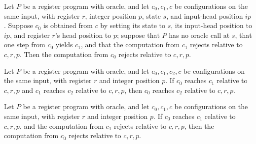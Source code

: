 \begin{lemma}
\label{Complexity.LogProg.Rejects.step}
\leanok
{}
Let $P$ be a register program with oracle, and let $c_0,c_1,c$ be configurations on the
same input, with register $r$, integer position $p$, state $s$, and input-head position
$ip$. Suppose $c_0$ is obtained from $c$ by setting its state to $s$, its input-head
position to $ip$, and register $r$'s head position to $p$; suppose that $P$ has no
oracle call at $s$, that one step from $c_0$ yields $c_1$, and that the computation from
$c_1$ rejects relative to $c,r,p$. Then the computation from $c_0$ rejects relative to
$c,r,p$.
\end{lemma}

\begin{lemma}
\label{Complexity.LogProg.Reaches.trans}
\leanok
{}
Let $P$ be a register program with oracle, and let $c_0,c_1,c_2,c$ be configurations on
the same input, with register $r$ and integer position $p$. If $c_0$ reaches $c_1$
relative to $c,r,p$ and $c_1$ reaches $c_2$ relative to $c,r,p$, then $c_0$ reaches
$c_2$ relative to $c,r,p$.
\end{lemma}

\begin{lemma}
\label{Complexity.LogProg.Reaches.rejects}
\leanok
{}
Let $P$ be a register program with oracle, and let $c_0,c_1,c$ be configurations on the
same input, with register $r$ and integer position $p$. If $c_0$ reaches $c_1$ relative
to $c,r,p$, and the computation from $c_1$ rejects relative to $c,r,p$, then the
computation from $c_0$ rejects relative to $c,r,p$.
\end{lemma}

